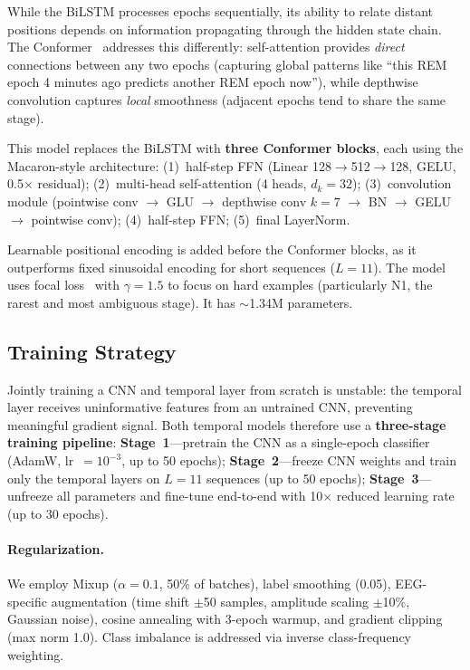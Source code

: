 \documentclass[final]{article}
\begin{document}
While the BiLSTM processes epochs sequentially, its ability to relate distant positions depends on information propagating through the hidden state chain. The Conformer~\cite{Gulati2020} addresses this differently: self-attention provides \emph{direct} connections between any two epochs (capturing global patterns like ``this REM epoch 4 minutes ago predicts another REM epoch now''), while depthwise convolution captures \emph{local} smoothness (adjacent epochs tend to share the same stage).

This model replaces the BiLSTM with \textbf{three Conformer blocks}, each using the Macaron-style architecture: (1)~half-step FFN (Linear 128$\to$512$\to$128, GELU, 0.5$\times$ residual); (2)~multi-head self-attention (4 heads, $d_k = 32$); (3)~convolution module (pointwise conv $\to$ GLU $\to$ depthwise conv $k\!=\!7$ $\to$ BN $\to$ GELU $\to$ pointwise conv); (4)~half-step FFN; (5)~final LayerNorm.

Learnable positional encoding is added before the Conformer blocks, as it outperforms fixed sinusoidal encoding for short sequences ($L = 11$). The model uses focal loss~\cite{Lin2017} with $\gamma = 1.5$ to focus on hard examples (particularly N1, the rarest and most ambiguous stage). It has $\sim$1.34M parameters.

\subsection{Training Strategy}
\label{sec:training}

Jointly training a CNN and temporal layer from scratch is unstable: the temporal layer receives uninformative features from an untrained CNN, preventing meaningful gradient signal. Both temporal models therefore use a \textbf{three-stage training pipeline}: \textbf{Stage~1}---pretrain the CNN as a single-epoch classifier (AdamW, lr~$= 10^{-3}$, up to 50 epochs); \textbf{Stage~2}---freeze CNN weights and train only the temporal layers on $L = 11$ sequences (up to 50 epochs); \textbf{Stage~3}---unfreeze all parameters and fine-tune end-to-end with 10$\times$ reduced learning rate (up to 30 epochs).

\paragraph{Regularization.} We employ Mixup ($\alpha = 0.1$, 50\% of batches), label smoothing (0.05), EEG-specific augmentation (time shift $\pm$50 samples, amplitude scaling $\pm$10\%, Gaussian noise), cosine annealing with 3-epoch warmup, and gradient clipping (max norm 1.0). Class imbalance is addressed via inverse class-frequency weighting.
\end{document}
